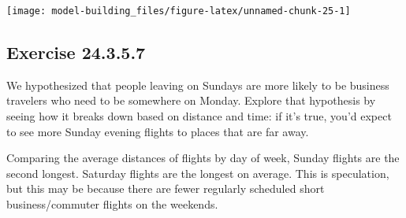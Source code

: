 \documentclass[]{book}
\newenvironment{Shaded}{\begin{snugshade}}{\end{snugshade}}
\newcommand{\DataTypeTok}[1]{\textcolor[rgb]{0.13,0.29,0.53}{#1}}
\newcommand{\FloatTok}[1]{\textcolor[rgb]{0.00,0.00,0.81}{#1}}
\newcommand{\KeywordTok}[1]{\textcolor[rgb]{0.13,0.29,0.53}{\textbf{#1}}}
\newcommand{\NormalTok}[1]{#1}
\newcommand{\OperatorTok}[1]{\textcolor[rgb]{0.81,0.36,0.00}{\textbf{#1}}}
\newcommand{\OtherTok}[1]{\textcolor[rgb]{0.56,0.35,0.01}{#1}}
\newcommand{\StringTok}[1]{\textcolor[rgb]{0.31,0.60,0.02}{#1}}
\theoremstyle{plain}
\theoremstyle{remark}
\begin{document}
\begin{Shaded}
\end{Shaded}

\begin{center}\texttt{[image: model-building\_files/figure-latex/unnamed-chunk-25-1]} \end{center}

\hypertarget{exercise-24.3.5.7}{%
\subsection*{\texorpdfstring{Exercise {24.3.5.7}}{Exercise 24.3.5.7}}\label{exercise-24.3.5.7}}

We hypothesized that people leaving on Sundays are more likely to be business travelers who need to be somewhere on Monday. Explore that hypothesis by seeing how it breaks down based on distance and time: if it's true, you'd expect to see more Sunday evening flights to places that are far away.

Comparing the average distances of flights by day of week, Sunday flights are the
second longest. Saturday flights are the longest on average. This is speculation, but
this may be because there are fewer regularly scheduled short business/commuter flights
on the weekends.

\begin{Shaded}
\end{Shaded}
\end{document}
